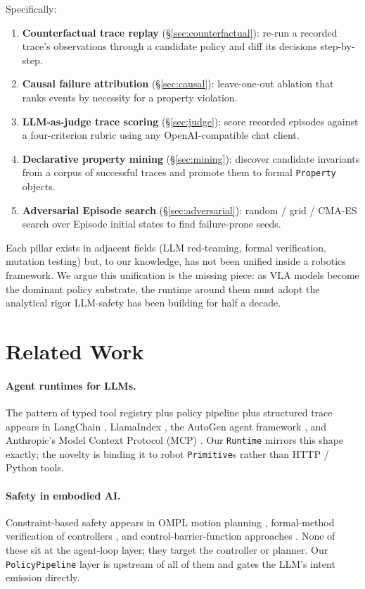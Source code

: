 \documentclass[11pt]{article}
\begin{document}
Specifically:
\begin{enumerate}
  \item \textbf{Counterfactual trace replay} (\S\ref{sec:counterfactual}):
        re-run a recorded trace's observations through a candidate
        policy and diff its decisions step-by-step.
  \item \textbf{Causal failure attribution} (\S\ref{sec:causal}):
        leave-one-out ablation that ranks events by necessity for
        a property violation.
  \item \textbf{LLM-as-judge trace scoring} (\S\ref{sec:judge}): score
        recorded episodes against a four-criterion rubric using any
        OpenAI-compatible chat client.
  \item \textbf{Declarative property mining} (\S\ref{sec:mining}):
        discover candidate invariants from a corpus of successful
        traces and promote them to formal \texttt{Property} objects.
  \item \textbf{Adversarial Episode search} (\S\ref{sec:adversarial}):
        random / grid / CMA-ES search over Episode initial states
        to find failure-prone seeds.
\end{enumerate}

Each pillar exists in adjacent fields (LLM red-teaming, formal
verification, mutation testing) but, to our knowledge, has not been
unified inside a robotics framework. We argue this unification is
the missing piece: as VLA models become the dominant policy
substrate, the runtime around them must adopt the analytical rigor
LLM-safety has been building for half a decade.

\section{Related Work}

\paragraph{Agent runtimes for LLMs.} The pattern of typed tool
registry plus policy pipeline plus structured trace appears in
LangChain \citep{langchain2022}, LlamaIndex \citep{llamaindex2023},
the AutoGen agent framework \citep{wu2023autogen}, and Anthropic's
Model Context Protocol (MCP) \citep{anthropic2024mcp}. Our
\texttt{Runtime} mirrors this shape exactly; the novelty is binding
it to robot \texttt{Primitive}s rather than HTTP / Python tools.

\paragraph{Safety in embodied AI.} Constraint-based safety appears
in OMPL motion planning \citep{sucan2012ompl}, formal-method
verification of controllers \citep{kress2017synthesis}, and
control-barrier-function approaches \citep{ames2019cbf}. None of
these sit at the agent-loop layer; they target the controller
or planner. Our \texttt{PolicyPipeline} layer is upstream of all
of them and gates the LLM's intent emission directly.
\end{document}
